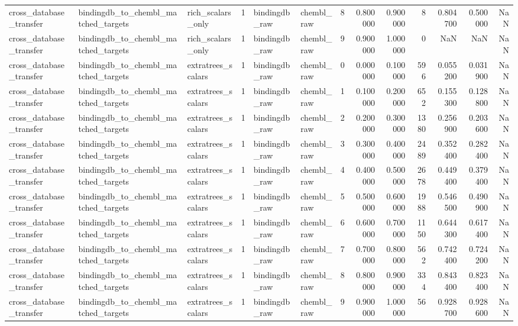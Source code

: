 \begin{longtable}{lllrllrrrrrrr}
cross\_database\_transfer & bindingdb\_to\_chembl\_matched\_targets & rich\_scalars\_only & 1 & bindingdb\_raw & chembl\_raw & 8 & 0.800000 & 0.900000 & 8 & 0.804700 & 0.500000 & NaN \\
cross\_database\_transfer & bindingdb\_to\_chembl\_matched\_targets & rich\_scalars\_only & 1 & bindingdb\_raw & chembl\_raw & 9 & 0.900000 & 1.000000 & 0 & NaN & NaN & NaN \\
cross\_database\_transfer & bindingdb\_to\_chembl\_matched\_targets & extratrees\_scalars & 1 & bindingdb\_raw & chembl\_raw & 0 & 0.000000 & 0.100000 & 596 & 0.055200 & 0.031900 & NaN \\
cross\_database\_transfer & bindingdb\_to\_chembl\_matched\_targets & extratrees\_scalars & 1 & bindingdb\_raw & chembl\_raw & 1 & 0.100000 & 0.200000 & 652 & 0.155300 & 0.128800 & NaN \\
cross\_database\_transfer & bindingdb\_to\_chembl\_matched\_targets & extratrees\_scalars & 1 & bindingdb\_raw & chembl\_raw & 2 & 0.200000 & 0.300000 & 1380 & 0.256900 & 0.203600 & NaN \\
cross\_database\_transfer & bindingdb\_to\_chembl\_matched\_targets & extratrees\_scalars & 1 & bindingdb\_raw & chembl\_raw & 3 & 0.300000 & 0.400000 & 2489 & 0.352400 & 0.282400 & NaN \\
cross\_database\_transfer & bindingdb\_to\_chembl\_matched\_targets & extratrees\_scalars & 1 & bindingdb\_raw & chembl\_raw & 4 & 0.400000 & 0.500000 & 2678 & 0.449400 & 0.379400 & NaN \\
cross\_database\_transfer & bindingdb\_to\_chembl\_matched\_targets & extratrees\_scalars & 1 & bindingdb\_raw & chembl\_raw & 5 & 0.500000 & 0.600000 & 1988 & 0.546500 & 0.490900 & NaN \\
cross\_database\_transfer & bindingdb\_to\_chembl\_matched\_targets & extratrees\_scalars & 1 & bindingdb\_raw & chembl\_raw & 6 & 0.600000 & 0.700000 & 1150 & 0.644300 & 0.617400 & NaN \\
cross\_database\_transfer & bindingdb\_to\_chembl\_matched\_targets & extratrees\_scalars & 1 & bindingdb\_raw & chembl\_raw & 7 & 0.700000 & 0.800000 & 562 & 0.742400 & 0.724200 & NaN \\
cross\_database\_transfer & bindingdb\_to\_chembl\_matched\_targets & extratrees\_scalars & 1 & bindingdb\_raw & chembl\_raw & 8 & 0.800000 & 0.900000 & 334 & 0.843400 & 0.823400 & NaN \\
cross\_database\_transfer & bindingdb\_to\_chembl\_matched\_targets & extratrees\_scalars & 1 & bindingdb\_raw & chembl\_raw & 9 & 0.900000 & 1.000000 & 56 & 0.928700 & 0.928600 & NaN \\

\end{longtable}
